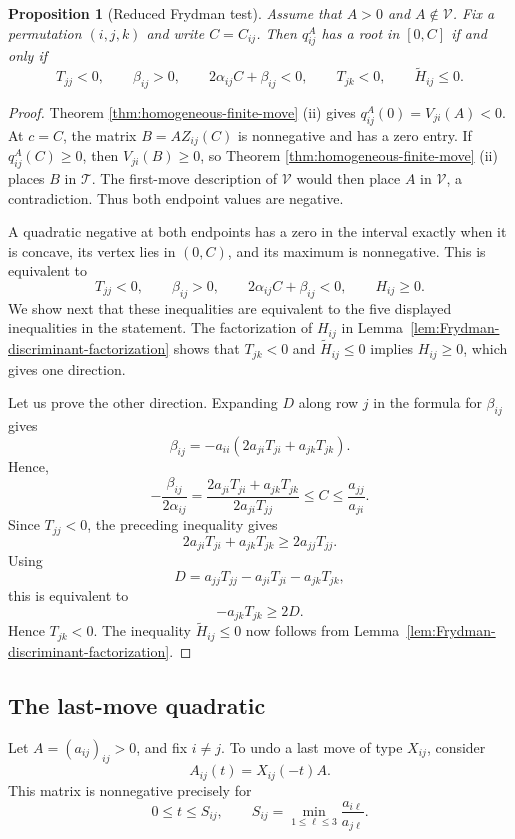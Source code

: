 \documentclass[11pt,onecolumn]{amsart}
\theoremstyle{plain}
\newtheorem{proposition}[theorem]{Proposition}
\theoremstyle{definition}
\theoremstyle{remark}
\newcommand{\T}{\mathcal T}
\newcommand{\V}{\mathcal V}
\begin{document}
\begin{proposition}[Reduced Frydman test]
\label{prop:reduced-Frydman-test}
Assume that $A>0$ and $A\notin\V$.  Fix a permutation $(i,j,k)$ and
write $C=C_{ij}$.  Then $q_{ij}^A$ has a root in $[0,C]$ if and only if
\[
T_{jj}<0,
\qquad
\beta_{ij}>0,
\qquad
2\alpha_{ij}C+\beta_{ij}<0,
\qquad
T_{jk}<0,\qquad \widetilde H_{ij}\leq0.
\]
\end{proposition}

\begin{proof}
Theorem \ref{thm:homogeneous-finite-move} (ii) gives
$q_{ij}^A(0)=V_{ji}(A)<0$.  At $c=C$, the matrix $B=AZ_{ij}(C)$
is nonnegative and has a zero entry. If $q_{ij}^A(C)\geq0$, then \(V_{ji}(B)\geq0\), 
so Theorem \ref{thm:homogeneous-finite-move} (ii) places $B$ in $\T$.  The first-move description of $\V$ would then place $A$ in
$\V$, a contradiction.  Thus both endpoint values are negative.

A quadratic negative at both endpoints has a zero in the interval
exactly when it is concave, its vertex lies in $(0,C)$, and its maximum
is nonnegative.  This is equivalent to
\[
T_{jj}<0,
\qquad
\beta_{ij}>0,
\qquad
2\alpha_{ij}C+\beta_{ij}<0,
\qquad H_{ij}\geq0.
\]
We show next that these inequalities are equivalent to the five displayed inequalities
in the statement. The factorization of $H_{ij}$ in Lemma~\ref{lem:Frydman-discriminant-factorization}
shows that $T_{jk}<0$ and $\widetilde H_{ij}\leq0$ implies $H_{ij}\geq 0$, which gives one direction.


Let us prove the other direction. Expanding
$D$ along row $j$ in the formula for $\beta_{ij}$ gives
\[
\beta_{ij}=-a_{ii}(2a_{ji}T_{ji}+a_{jk}T_{jk}).
\]
Hence,
\[
-\frac{\beta_{ij}}{2\alpha_{ij}}
=\frac{2a_{ji}T_{ji}+a_{jk}T_{jk}}{2a_{ji}T_{jj}}\leq C\leq \frac{a_{jj}}{a_{ji}}.
\]
Since $T_{jj}<0$, the preceding inequality gives
\[
2a_{ji}T_{ji}+a_{jk}T_{jk}
\geq 2a_{jj}T_{jj}.
\]
Using
\[
D=a_{jj}T_{jj}-a_{ji}T_{ji}-a_{jk}T_{jk},
\]
this is equivalent to
\[
-a_{jk}T_{jk}\geq2D.
\]
Hence $T_{jk}<0$. The inequality $\widetilde H_{ij}\leq0$ now follows from Lemma~\ref{lem:Frydman-discriminant-factorization}.
\end{proof}

\subsection{The last-move quadratic}

Let \(A=(a_{ij})_{ij}>0\), and fix \(i\neq j\). To undo a last move of
type \(X_{ij}\), consider
\[
A_{ij}(t)=X_{ij}(-t)A.
\]
This matrix is nonnegative precisely for
\[
0\leq t\leq S_{ij},
\qquad
S_{ij}=\min_{1\leq\ell\leq3}\frac{a_{i\ell}}{a_{j\ell}}.
\]
\end{document}
